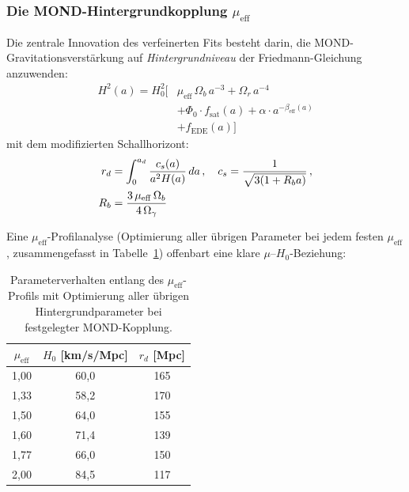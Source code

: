 \documentclass[aps,prd,twocolumn,superscriptaddress,nofootinbib,floatfix]{revtex4-2}
\begin{document}
\subsubsection{Die MOND-Hintergrundkopplung \texorpdfstring{$\mu_{\mathrm{eff}}$}{mu\_eff}}
\label{subsubsec:mu_eff}

Die zentrale Innovation des verfeinerten Fits besteht darin, die MOND-Gravitationsverstärkung auf \textit{Hintergrundniveau} der Friedmann-Gleichung anzuwenden:
\begin{equation}
\begin{split}
H^2(a) = H_0^2 \Big[&\mu_{\mathrm{eff}}\,\Omega_b\,a^{-3} + \Omega_r\,a^{-4} \\
&+ \Phi_0 \cdot f_{\mathrm{sat}}(a) + \alpha \cdot a^{-\beta_{\mathrm{eff}}(a)} \\
&+ f_{\mathrm{EDE}}(a)\Big]
\end{split}
\label{eq:mond_friedmann}
\end{equation}
mit dem modifizierten Schallhorizont:
\begin{align}
r_d &= \int_0^{a_d} \frac{c_s(a)}{a^2 H(a)} \, da\,,\quad c_s = \frac{1}{\sqrt{3(1 + R_b a)}}\,,\notag\\
R_b &= \frac{3\,\mu_{\mathrm{eff}}\,\Omega_b}{4\,\Omega_\gamma}
\label{eq:mond_rs}
\end{align}

Eine $\mu_{\mathrm{eff}}$-Profilanalyse (Optimierung aller übrigen Parameter bei jedem festen $\mu_{\mathrm{eff}}$, zusammengefasst in Tabelle~\ref{tab:mu_profile}) offenbart eine klare $\mu$--$H_0$-Beziehung:

\begin{table}[t]
\centering
\caption{Parameterverhalten entlang des $\mu_{\mathrm{eff}}$-Profils mit Optimierung aller übrigen Hintergrundparameter bei festgelegter MOND-Kopplung.}
\label{tab:mu_profile}
\begin{tabular}{ccc}
\toprule
$\mu_{\mathrm{eff}}$ & $H_0$ [km/s/Mpc] & $r_d$ [Mpc] \\
\midrule
1{,}00 & 60{,}0 & 165 \\
1{,}33 & 58{,}2 & 170 \\
1{,}50 & 64{,}0 & 155 \\
1{,}60 & 71{,}4 & 139 \\
1{,}77 & 66{,}0 & 150 \\
2{,}00 & 84{,}5 & 117 \\
\bottomrule
\end{tabular}
\end{table}
\end{document}
